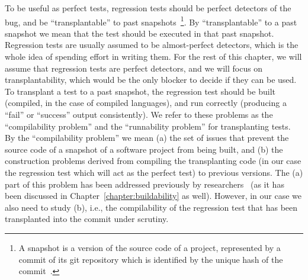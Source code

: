 To be useful as perfect tests, regression tests should be perfect detectors of the bug, and be ``transplantable'' to past snapshots~\footnote{A snapshot is a version of the source code of a project, represented by a commit of its git repository which is identified by the unique hash of the commit~\cite{maes2022revisiting}.}. By ``transplantable'' to a past snapshot we mean that the test should be executed in that past snapshot. Regression tests are usually assumed to be almost-perfect detectors, 
which is the whole idea of spending effort in writing them. For the rest of this chapter, we will assume that regression tests are perfect detectors, and we will focus on transplantability, which would be the only blocker to decide if they can be used. To transplant a test to a past snapshot, the regression test should be built (compiled, in the case of compiled languages), and run correctly (producing a ``fail'' or ``success'' output consistently).
We refer to these  problems as the ``compilability problem'' and the ``runnability problem'' for transplanting tests.
By the ``compilability problem'' we mean (a) the set of issues that prevent the source code of a snapshot of a software project from being built, and (b) the construction problems derived from compiling the transplanting code (in our case the regression test which will act as the perfect test) to previous versions. The (a) part of this problem has been addressed previously by researchers~\cite{tufano2017there} (as it has been discussed in Chapter~\ref{chapter:buildability} as well). However, in our case we also need to study (b), i.e., the compilability of the regression test that has been transplanted into the commit under scrutiny. 
